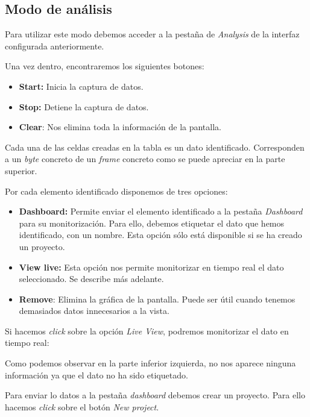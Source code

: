 \subsection{Modo de análisis}

Para utilizar este modo debemos acceder a la pestaña de \emph{Analysis} de la interfaz configurada anteriormente.

Una vez dentro, encontraremos los siguientes botones:
\begin{itemize}
\item
\textbf{Start:} Inicia la captura de datos.
\item
\textbf{Stop:} Detiene la captura de datos.
\item
\textbf{Clear}: Nos elimina toda la información de la pantalla.
\end{itemize}


Cada una de las celdas creadas en la tabla es un dato identificado. Corresponden a un \emph{byte} concreto de un \emph{frame} concreto como se puede apreciar en la parte superior.

Por cada elemento identificado disponemos de tres opciones:
\begin{itemize}
\item
\textbf{Dashboard:} Permite enviar el elemento identificado a la pestaña \emph{Dashboard} para su monitorización. Para ello, debemos etiquetar el dato que hemos identificado, con un nombre. Esta opción sólo está disponible si se ha creado un proyecto. 
\item
\textbf{View live:} Esta opción nos permite monitorizar en tiempo real el dato seleccionado. Se describe más adelante.
\item
\textbf{Remove}: Elimina la gráfica de la pantalla. Puede ser útil cuando tenemos demasiados datos innecesarios a la vista.
\end{itemize}

Si hacemos \emph{click} sobre la opción \textit{Live View}, podremos monitorizar el dato en tiempo real:


Como podemos observar en la parte inferior izquierda, no nos aparece ninguna información ya que el dato no ha sido etiquetado.

Para enviar lo datos a la pestaña \emph{dashboard} debemos crear un proyecto. Para ello hacemos \emph{click} sobre el botón \textit{New project}.

